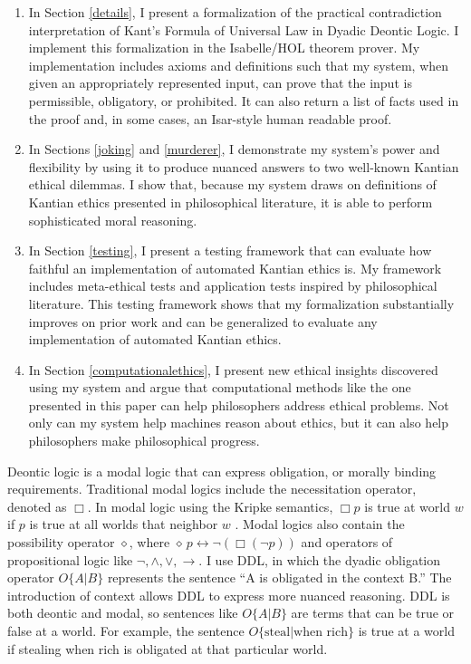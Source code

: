 \begin{isabellebody}
\begin{isamarkuptext}
\begin{enumerate}
\item In Section \ref{details}, I present a formalization of the practical contradiction interpretation of Kant's 
Formula of Universal Law in Dyadic Deontic Logic. I implement this formalization in the Isabelle/HOL
theorem prover. My implementation includes axioms and definitions such that my system, when given an appropriately
represented input, can prove that the input is permissible, obligatory, or prohibited. It can also return
a list of facts used in the proof and, in some cases, an Isar-style human readable proof. 

\item In Sections \ref{joking} and \ref{murderer}, I demonstrate my system's power and flexibility by 
using it to produce nuanced answers to two well-known Kantian ethical dilemmas. I show that, because 
my system draws on definitions of Kantian ethics presented in philosophical literature, it is able 
to perform sophisticated moral reasoning. 

\item In Section \ref{testing}, I present a testing framework that can evaluate how faithful an implementation 
of automated Kantian ethics is. My framework includes meta-ethical tests and application tests inspired by philosophical
literature. This testing framework shows that my formalization substantially improves on prior work and can 
be generalized to evaluate any implementation of automated Kantian ethics.

\item In Section \ref{computationalethics}, I present new ethical insights discovered using my system and argue that
computational methods like the one presented in this paper can help philosophers address ethical problems.
Not only can my system help machines reason about ethics, but it can also help philosophers make philosophical
progress.
\end{enumerate}%
\end{isamarkuptext}\isamarkuptrue%
%
\begin{isamarkuptext}%
Deontic logic is a modal logic that can express obligation, or morally binding requirements. Traditional modal 
logics include the necessitation operator, denoted as $\Box$. In modal logic using the Kripke semantics, 
$\Box p$ is true at world $w$ if $p$ is true at all worlds that neighbor $w$ \citep{cresswell}. Modal 
logics  also contain the possibility operator $\diamond$, where $\diamond \, p \longleftrightarrow \neg (\Box (\neg p))$ 
and operators of propositional logic like $\neg, \wedge, \vee, \rightarrow$. I use DDL, in which
the dyadic obligation operator $O\{A \vert B\}$ represents the sentence ``A is obligated in the context B.'' 
The introduction of context allows DDL to express more nuanced reasoning. DDL is both deontic and modal, 
so sentences like $O\{A \vert B\}$ are terms that can be true or false at a world. For example, the 
sentence $O \{ \text{steal} \vert \text{when rich}\}$ is true at a world if stealing when rich is 
obligated at that particular world. 


\end{isamarkuptext}
\end{isabellebody}

